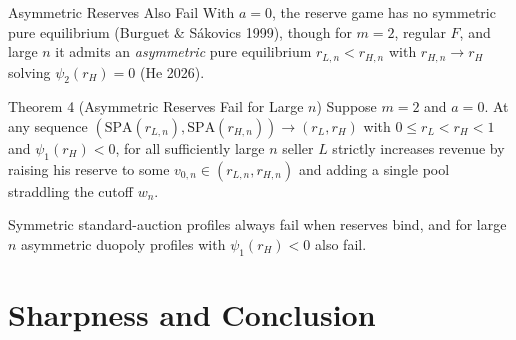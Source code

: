 \documentclass[11pt,aspectratio=169,handout]{beamer}
\newcommand{\SPA}{\mathrm{SPA}}
\def\seg#1#2#3#4{\fill[#3,draw=InkTwo,line width=0.3pt] (#1,#4) rectangle (#2,#4+0.42);}
\begin{document}
\begin{frame}{Asymmetric Reserves Also Fail}
With $a=0$, the reserve game has no symmetric pure equilibrium (Burguet \& S\'akovics 1999), though for $m=2$, regular $F$, and large $n$ it admits an \emph{asymmetric} pure equilibrium $r_{L,n}<r_{H,n}$ with $r_{H,n}\to r_H$ solving $\psi_2(r_H)=0$ (He 2026).

\medskip
\centering
{}

\raggedright\medskip{}
\begin{block}{Theorem 4 (Asymmetric Reserves Fail for Large $n$)}
Suppose $m=2$ and $a=0$. At any sequence $(\SPA(r_{L,n}),\SPA(r_{H,n}))\to(r_L,r_H)$ with $0\le r_L<r_H<1$ and $\psi_1(r_H)<0$, for all sufficiently large $n$ seller $L$ strictly increases revenue by raising his reserve to some $v_{0,n}\in(r_{L,n},r_{H,n})$ and adding a single pool straddling the cutoff $w_n$.
\end{block}
{\footnotesize Symmetric standard-auction profiles always fail when reserves bind, and for large $n$ asymmetric duopoly profiles with $\psi_1(r_H)<0$ also fail.}
\end{frame}

\section{Sharpness and Conclusion}
\end{document}
